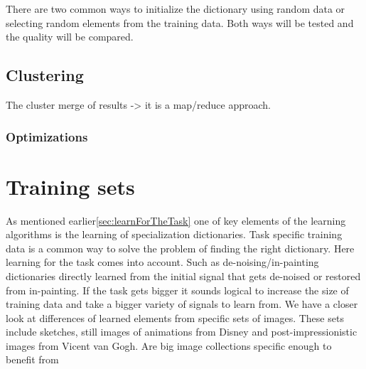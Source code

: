 There are two common ways to initialize the dictionary using random data or
selecting random elements from the training data. Both ways will be tested and 
the quality will be compared.

\subsection{Clustering}

The cluster merge of results -> 
it is a map/reduce approach. 


\subsubsection*{Optimizations}

\section{Training sets}
As mentioned earlier\ref{sec:learnForTheTask} one of key elements 
of the learning algorithms is the learning of specialization dictionaries.
Task specific training data is a common way to solve the problem of finding 
the right dictionary. Here learning for the task comes into
account. Such as de-noising/in-painting dictionaries directly learned from the
initial signal that gets de-noised or restored from in-painting. If the task
gets bigger it sounds logical to increase the size of training data and take a
bigger variety of signals to learn from.  We have a closer look at differences
of learned elements from specific sets of images. These sets include sketches,
still images of animations from Disney and post-impressionistic images from
Vicent van Gogh. 
Are big image collections specific enough to benefit from 




